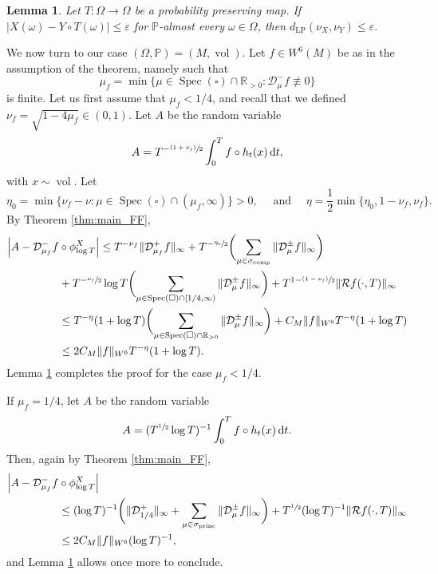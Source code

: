 \documentclass[11pt]{article}
\newcommand{\psfrac}[2]{\sfrac{(#1)}{#2}}
\newcommand \R{\mathbb{R}}
\newcommand*{\diff}{\mathop{}\!\mathrm{d}}
\newcommand{\Dm}[1]{\mathcal{D}_\mu^{-} #1}
\newcommand{\Dpm}[1]{\mathcal{D}_\mu^{\pm} #1}
\newcommand{\Levy}{d_{\levyy}}
\DeclareMathOperator{\vol}{vol}
\DeclareMathOperator{\Spec}{Spec}
\DeclareMathOperator{\comp}{comp}
\DeclareMathOperator{\princ}{princ}
\DeclareMathOperator{\levyy}{LP}
\newtheorem {lemma}[theorem]{Lemma}
\theoremstyle{definition}
\begin{document}
\begin{lemma}\label{lemma:levy}
Let $T \colon \Omega \to \Omega$ be a probability preserving map. If $|X(\omega) - Y\circ T(\omega)|\leq \varepsilon$ for $\mathbb{P}$-almost every $\omega \in \Omega$, then $\Levy(\nu_X, \nu_Y) \leq \varepsilon$.
\end{lemma}

We now turn to our case $(\Omega, \mathbb{P}) = (M, \vol)$.
Let $f \in W^6(M)$ be as in the assumption of the theorem, namely such that
\[
\mu_f = \min \{ \mu \in \Spec(\square) \cap \R_{>0} : \Dm{f} \not\equiv 0 \}
\]
is finite.
Let us first assume that $\mu_f <1/4$, and recall that we defined $\nu_f = \sqrt{1-4\mu_f} \in (0,1)$. Let $A$ be the random variable
\[
A = T^{-\psfrac{1+\nu_f}{2}} \int_0^T f \circ h_t(x) \diff t,
\]
with $x \sim \vol$.
Let
\[
\eta_0 = \min\{ \nu_f - \nu : \mu \in \Spec(\square) \cap (\mu_f, \infty) \} >0, \quad \text{ and } \quad \eta= \frac{1}{2} \min\{\eta_0, 1-\nu_f, \nu_f\}.
\]
By Theorem \ref{thm:main_FF},
\begin{align*}
\Bigl\lvert A - \mathcal{D}^{-}_{\mu_f} f&\circ \phi^X_{\log T} \Bigr\rvert \leq T^{- \nu_f} \|\mathcal{D}^{+}_{\mu_f} f\|_{\infty} + T^{- \sfrac{\eta_0}{2}} \biggl(\sum_{\mu \in \sigma_{\comp}} \|\Dpm{f} \|_{\infty} \biggr) \\
& + T^{- \sfrac{\nu_f}{2}} \log T \biggl(\sum_{\mu \in \Spec(\square) \cap [1/4, \infty)} \|\Dpm{f} \|_{\infty} \biggr) + T^{1-\psfrac{1-\nu_f}{2}} \|\mathcal{R}f(\cdot, T) \|_{\infty} \\
&\leq T^{-\eta} (1+\log T) \biggl(\sum_{\mu \in \Spec(\square) \cap \R_{>0}} \|\Dpm{f} \|_{\infty} \biggr) + C_M \|f\|_{W^6} T^{-\eta}(1+\log T)\\
&\leq 2C_M \|f\|_{W^6} T^{-\eta}(1+\log T).
\end{align*}
Lemma \ref{lemma:levy} completes the proof for the case $\mu_f < 1/4$.

If $\mu_f = 1/4$, let $A$ be the random variable
\[
A = (T^{\sfrac{1}{2}} \log T)^{-1} \int_0^T f \circ h_t(x) \diff t.
\]
Then, again by Theorem \ref{thm:main_FF},
\begin{align*}
\Bigl\lvert A - \mathcal{D}^{-}_{\mu_f} f &\circ \phi^X_{\log T} \Bigr\rvert\\
&\leq (\log T)^{-1} \biggl(\|\mathcal{D}^{+}_{1/4} \|_{\infty} + \sum_{\mu \in \sigma_{\princ}} \|\Dpm{f} \|_{\infty} \biggr) + T^{\sfrac{1}{2}} (\log T)^{-1} \|\mathcal{R}f(\cdot, T) \|_{\infty} \\
& \leq 2C_M \|f\|_{W^6} (\log T)^{-1},
\end{align*}
and Lemma \ref{lemma:levy} allows once more to conclude.
\end{document}
